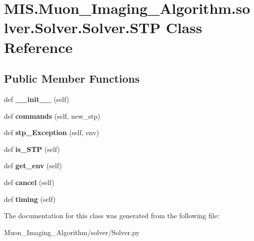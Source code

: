 \hypertarget{classMIS_1_1Muon__Imaging__Algorithm_1_1solver_1_1Solver_1_1Solver_1_1STP}{}\section{M\+I\+S.\+Muon\+\_\+\+Imaging\+\_\+\+Algorithm.\+solver.\+Solver.\+Solver.\+S\+TP Class Reference}
\label{classMIS_1_1Muon__Imaging__Algorithm_1_1solver_1_1Solver_1_1Solver_1_1STP}
\subsection*{Public Member Functions}
\begin{DoxyCompactItemize}
\item 
\mbox{\label{classMIS_1_1Muon__Imaging__Algorithm_1_1solver_1_1Solver_1_1Solver_1_1STP_ae173adeaa22fbcecf56a85228af328d4}} 
def {\bfseries \+\_\+\+\_\+init\+\_\+\+\_\+} (self)
\item 
\mbox{\label{classMIS_1_1Muon__Imaging__Algorithm_1_1solver_1_1Solver_1_1Solver_1_1STP_ab5ce23cd2711b5c9852a79df03ebada7}} 
def {\bfseries commands} (self, new\+\_\+stp)
\item 
\mbox{\label{classMIS_1_1Muon__Imaging__Algorithm_1_1solver_1_1Solver_1_1Solver_1_1STP_a0e47811048a79e0a45875b450d4989bb}} 
def {\bfseries stp\+\_\+\+Exception} (self, env)
\item 
\mbox{\label{classMIS_1_1Muon__Imaging__Algorithm_1_1solver_1_1Solver_1_1Solver_1_1STP_aa5f081dd05d234faf631e74b1a91f788}} 
def {\bfseries is\+\_\+\+S\+TP} (self)
\item 
\mbox{\label{classMIS_1_1Muon__Imaging__Algorithm_1_1solver_1_1Solver_1_1Solver_1_1STP_a56032345eca71be5211e910cc1c97c68}} 
def {\bfseries get\+\_\+env} (self)
\item 
\mbox{\label{classMIS_1_1Muon__Imaging__Algorithm_1_1solver_1_1Solver_1_1Solver_1_1STP_afae2f5d0788fc34e6c56ea65a4bb7b95}} 
def {\bfseries cancel} (self)
\item 
\mbox{\label{classMIS_1_1Muon__Imaging__Algorithm_1_1solver_1_1Solver_1_1Solver_1_1STP_aada0ba9d8072ad716390e1e528c28952}} 
def {\bfseries timing} (self)
\end{DoxyCompactItemize}


The documentation for this class was generated from the following file\+:\begin{DoxyCompactItemize}
\item 
Muon\+\_\+\+Imaging\+\_\+\+Algorithm/solver/Solver.\+py\end{DoxyCompactItemize}
